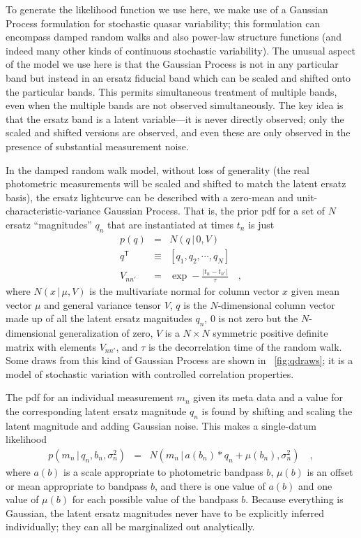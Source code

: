 \documentclass[letterpaper,12pt,preprint]{aastex}
\newcommand{\given}{\,|\,}
\newcommand{\transpose}[1]{{#1}^{\mathsf{T}}}
\begin{document}
To generate the likelihood function we use here, we make
use of a Gaussian Process formulation for stochastic quasar
variability; this formulation can encompass damped random walks
and also power-law structure functions (and indeed many other kinds of
continuous stochastic variability).  The unusual aspect of the model
we use here is that the Gaussian Process is not in any particular band
but instead in an ersatz fiducial band which can be scaled and shifted
onto the particular bands.  This permits simultaneous treatment of
multiple bands, even when the multiple bands are not observed
simultaneously.  The key idea is that the ersatz band is a latent
variable---it is never directly observed; only the scaled and shifted
versions are observed, and even these are only observed in the
presence of substantial measurement noise.

In the damped random walk model, without loss of generality (the real
photometric measurements will be scaled and shifted to match the
latent ersatz basis), the ersatz lightcurve can be described with a
zero-mean and unit-characteristic-variance Gaussian Process.  That is,
the prior pdf for a set of $N$ ersatz ``magnitudes'' $q_n$ that are
instantiated at times $t_n$ is just
\begin{eqnarray}
p(q) &=& N(q\given 0,V)
\\
\transpose{q} &\equiv& [q_1, q_2, \cdots , q_N]
\\
V_{nn'} &=& \exp -\frac{|t_n - t_{n'}|}{\tau}
\quad ,
\end{eqnarray}
where $N(x\given\mu,V)$ is the multivariate normal for column vector
$x$ given mean vector $\mu$ and general variance tensor $V$, $q$ is
the $N$-dimensional column vector made up of all the latent ersatz
magnitudes $q_n$, $0$ is not zero but the $N$-dimensional
generalization of zero, $V$ is a $N\times N$ symmetric positive
definite matrix with elements $V_{nn'}$, and $\tau$ is the
decorrelation time of the random walk.  Some draws from this kind of
Gaussian Process are shown in \figurename~\ref{fig:qdraws}; it is a
model of stochastic variation with controlled correlation properties.

The pdf for an individual measurement $m_n$ given its meta data and a
value for the corresponding latent ersatz magnitude $q_n$ is found by
shifting and scaling the latent magnitude and adding Gaussian noise.
This makes a single-datum likelihood
\begin{eqnarray}
p(m_n\given q_n,b_n,\sigma_n^2) &=& N(m_n\given a(b_n) * q_n + \mu(b_n), \sigma_n^2)
\quad ,
\end{eqnarray}
where $a(b)$ is a scale appropriate to photometric bandpass $b$,
$\mu(b)$ is an offset or mean appropriate to bandpass $b$, and there
is one value of $a(b)$ and one value of $\mu(b)$ for each possible
value of the bandpass $b$.  Because everything is Gaussian, the latent
ersatz magnitudes never have to be explicitly inferred individually;
they can all be marginalized out analytically.
\end{document}
